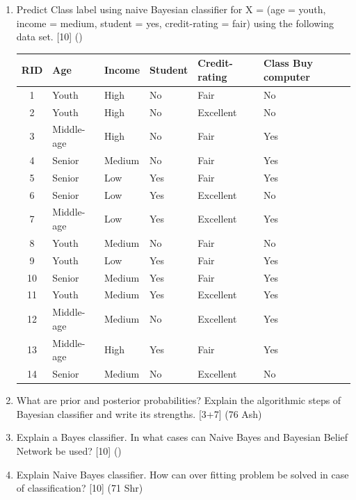 \documentclass[12pt]{article}
\begin{document}
\begin{enumerate}[topsep=0pt, noitemsep]
      \item Predict Class label using naive Bayesian classifier for X = (age = youth, income = medium, student = yes, credit-rating = fair) using the following data set. \hfill [10] ()\\
        \small
        \begin{tabular}{|c|l|l|l|l|l|}
          \hline
          RID & Age & Income & Student & Credit-rating & Class Buy computer \\ \hline
          1 & Youth & High & No & Fair & No \\ \hline
          2 & Youth & High & No & Excellent & No \\ \hline
          3 & Middle-age & High & No & Fair & Yes \\ \hline
          4 & Senior & Medium & No & Fair & Yes \\ \hline
          5 & Senior & Low & Yes & Fair & Yes \\ \hline
          6 & Senior & Low & Yes & Excellent & No \\ \hline
          7 & Middle-age & Low & Yes & Excellent & Yes \\ \hline
          8 & Youth & Medium & No & Fair & No \\ \hline
          9 & Youth & Low & Yes & Fair & Yes \\ \hline
          10 & Senior & Medium & Yes & Fair & Yes \\ \hline
          11 & Youth & Medium & Yes & Excellent & Yes \\ \hline
          12 & Middle-age & Medium & No & Excellent & Yes \\ \hline
          13 & Middle-age & High & Yes & Fair & Yes \\ \hline
          14 & Senior & Medium & No & Excellent & No \\ \hline
        \end{tabular}
        \normalsize

      \item What are prior and posterior probabilities? Explain the algorithmic steps of Bayesian classifier and write its strengths. \hfill [3+7] (76 Ash)

      \item Explain a Bayes classifier. In what cases can Naive Bayes and Bayesian Belief Network be used? \hfill [10] ()

      \item Explain Naive Bayes classifier. How can over fitting problem be solved in case of classification? \hfill [10] (71 Shr)


\end{enumerate}
\end{document}

